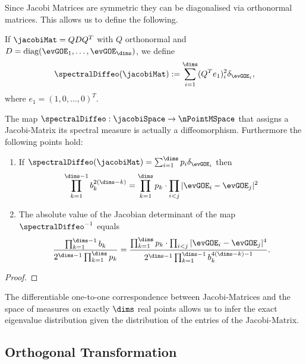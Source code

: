 Since Jacobi Matrices are symmetric they can be diagonalised via orthonormal matrices. This allows us to define the following.

\begin{definition}
    If $\jacobiMat = QDQ^T$ with $Q$ orthonormal and $D = \operatorname{diag}(\evGOE_1, \ldots, \evGOE_\dims)$, we define
    \begin{align*}
        \spectralDiffeo(\jacobiMat) := \sum_{i=1}^{\dims} (Q^T e_1)^2_i \delta_{\evGOE_i},
    \end{align*}
    where $e_1 = (1,0,\ldots,0)^T$.
\end{definition}

\begin{theorem}\label{thm: trafoTheorem}
    The map $\spectralDiffeo: \jacobiSpace \to \nPointMSpace$ that assigns a Jacobi-Matrix its spectral measure is actually a diffeomorphism. Furthermore the following points hold:
    \begin{enumerate}[label=(\alph*)]
        \item If $\spectralDiffeo(\jacobiMat) = \sum_{i=1}^\dims p_i \delta_{\evGOE_i}$ then
        \begin{align}
            \prod_{k=1}^{\dims-1} b_k^{2(\dims-k)} = \prod_{k=1}^\dims p_k \cdot \prod_{i<j} |\evGOE_i - \evGOE_j|^2
        \end{align}
        \item The absolute value of the Jacobian determinant of the map $\spectralDiffeo^{-1}$ equals
        \begin{align}\label{inverseSpectralDet}
            \frac{\prod_{k=1}^{\dims-1} b_k}{2^{\dims-1} \prod_{k=1}^\dims p_k} 
            = \frac{\prod_{k=1}^\dims p_k \cdot \prod_{i<j} |\evGOE_i - \evGOE_j|^4}{2^{\dims-1} \prod_{k=1}^{\dims-1} b_k^{4(\dims - k)-1}}.
        \end{align}
    \end{enumerate}
\end{theorem}
\begin{proof}
\end{proof}

The differentiable one-to-one correspondence between Jacobi-Matrices and the space of measures on exactly $\dims$ real points allows us to infer the exact eigenvalue distribution given the distribution of the entries of the Jacobi-Matrix.

\subsection{Orthogonal Transformation}

